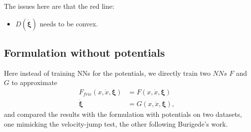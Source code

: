 \noindent The issues here are that the red line:
\begin{itemize}
    \item $D(\dot{\bm{\xi}})$ needs to be convex. 
\end{itemize}

\subsection{Formulation without potentials}
\noindent Here instead of training NNs for the potentials, 
we directly train two $NNs$ $F$ and $G$ to approximate
\begin{align}
    F_{fric}(x, \dot{x}, \bm{\xi}) &= F(x, \dot{x}, \bm{\xi}) \label{eq:FFriction} \\
    \dot{\bm{\xi}} &= G(x, \dot{x}, \bm{\xi}) \label{eq:GforXi}, 
\end{align}
and compared the results with the formulation with potentials on two datasets, 
one mimicking the velocity-jump test, 
the other following Burigede's work. 

